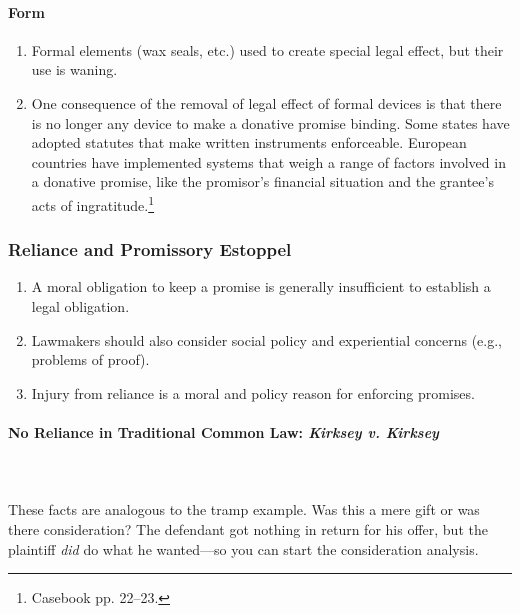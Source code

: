 \paragraph{Form}

\begin{enumerate}
    \item Formal elements (wax seals, etc.) used to create special legal 
    effect, but their use is waning.
    \item One consequence of the removal of legal effect of formal devices is 
    that there is no longer any device to make a donative promise binding. 
    Some states have adopted statutes that make written instruments 
    enforceable. European countries have implemented systems that weigh a 
    range of factors involved in a donative promise, like the promisor's 
    financial situation and the grantee's acts of 
    ingratitude.\footnote{Casebook pp. 22--23.}
\end{enumerate}

\subsubsection{Reliance and Promissory Estoppel}

\begin{enumerate}
    \item A moral obligation to keep a promise is generally insufficient to 
    establish a legal obligation.
    \item Lawmakers should also consider social policy and experiential 
    concerns (e.g., problems of proof).
    \item Injury from reliance is a moral and policy reason for enforcing 
    promises.
\end{enumerate}

\paragraph{No Reliance in Traditional Common Law: \emph{Kirksey v. Kirksey}}
~\\\\
These facts are analogous to the tramp example. Was this a mere gift or was 
there consideration? The defendant got nothing in return for his offer, but 
the plaintiff \emph{did} do what he wanted---so you can start the 
consideration analysis.

